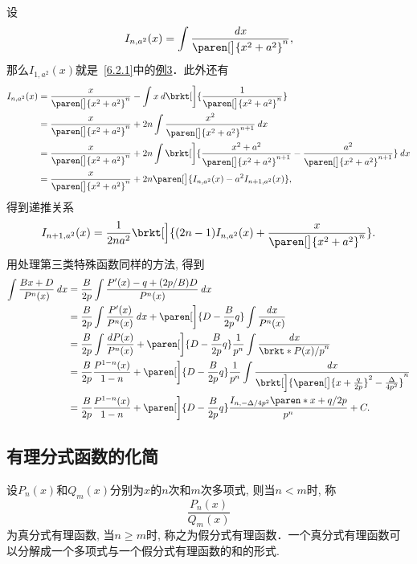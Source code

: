 \documentclass[a4paper,punct=CCT]{ctexbook}
\theoremstyle{definition}
\theoremstyle{remark}
\let\geq\geqslant
\let\ge\geq}
\begin{document}
\begin{enumerate}
  设
  \[
    I_{n,a^2}(x) = \int \frac{\dx}{\paren[\big]{x^2 + a^2}^n},
  \]
  那么\(I_{1,a^2}(x)\)就是~\ref{6.2.1}中的\hyperlink{eg:arctan}{例3}．此外还有
  \begin{align*}
    I_{n,a^2}(x)
    &= \frac{x}{\paren[\big]{x^2 + a^2}^n} - \int x \diff\brkt[\bigg]{\frac{1}{\paren[\big]{x^2 + a^2}^n}} \\
    &= \frac{x}{\paren[\big]{x^2 + a^2}^n} + 2n \int \frac{x^2}{\paren[\big]{x^2 + a^2}^{n+1}} \dx \\
    &= \frac{x}{\paren[\big]{x^2 + a^2}^n} + 2n \int \brkt[\bigg]{\frac{x^2 + a^2}{\paren[\big]{x^2 + a^2}^{n+1}} - \frac{a^2}{\paren[\big]{x^2 + a^2}^{n+1}}} \dx \\
    &= \frac{x}{\paren[\big]{x^2 + a^2}^n} + 2n \paren[\big]{I_{n,a^2}(x) - a^2 I_{n+1,a^2}(x)},
  \end{align*}
  得到递推关系
  \begin{equation}
    I_{n+1,a^2}(x) = \frac{1}{2na^2} \brkt[\Big]{(2n-1) I_{n,a^2}(x) + \frac{x}{\paren[\big]{x^2 + a^2}^n}}.
  \end{equation}
  用处理第三类特殊函数同样的方法, 得到
  \begin{align*}
    \int \frac{Bx+D}{P^n(x)} \dx
    &= \frac{B}{2p} \int \frac{P'(x) - q + (2p/B)D}{P^n(x)} \dx \\
    &= \frac{B}{2p} \int \frac{P'(x)}{P^n(x)} \dx + \paren[\bigg]{D - \frac{B}{2p} q} \int \frac{\dx}{P^n(x)} \\
    &= \frac{B}{2p} \int \frac{\diff P(x)}{P^n(x)} + \paren[\bigg]{D - \frac{B}{2p} q} \frac1{p^n} \int \frac{\dx}{\brkt*{P(x)/p}^n} \\
    &= \frac{B}{2p} \frac{P^{1-n}(x)}{1-n} + \paren[\bigg]{D - \frac{B}{2p} q} \frac1{p^n} \int \frac{\dx}{\brkt[\Big]{\paren[\big]{x+\frac{q}{2p}}^2 - \frac{\Delta}{4p^2}}^n} \\
    &= \frac{B}{2p} \frac{P^{1-n}(x)}{1-n} + \paren[\bigg]{D - \frac{B}{2p} q} \frac{I_{n,-\Delta/4p^2}\paren*{x+q/2p}}{p^n} + C.
  \end{align*}
\end{enumerate}

\subsection{有理分式函数的化简}

设\(P_n(x)\)和\(Q_m(x)\)分别为\(x\)的\(n\)次和\(m\)次多项式, 则当\(n < m\)时, 称
\[
  \frac{P_n(x)}{Q_m(x)}
\]
为真分式有理函数, 当\(n \ge m\)时, 称之为假分式有理函数．一个真分式有理函数可以分解成一个多项式与一个假分式有理函数的和的形式.
\end{document}
